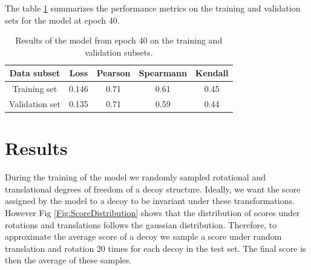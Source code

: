 \documentclass[a4paper,10pt]{article}
\begin{document}
The table \ref{Tbl:TrainingResults} summarizes the performance metrics on the training and validation sets for the model at epoch 40.

\begin{table}[H]
\begin{center}
\begin{tabular}{ c | c | c | c | c }
    Data subset & Loss & Pearson & Spearmann & Kendall \\
    \hline
    Training set     &0.146 &0.71 &0.61 &0.45 \\
    Validation set   &0.135 &0.71 &0.59 &0.44 \\ \hline

\end{tabular}
  \caption {Results of the model from epoch 40 on the training and validation subsets.}
    \label{Tbl:TrainingResults}
\end{center}
\end{table}

\section{Results}
During the training of the model we randomly sampled rotational and translational degrees of freedom of a decoy structure. Ideally, we 
want the score assigned by the model to a decoy to be invariant under these transformations. However Fig \ref{Fig:ScoreDistribution} 
shows that the distribution
of scores under rotations and translations follows the gaussian distribution. Therefore, to approximate the average score of a decoy we 
sample a score under random translation and rotation 20 times for each decoy in the test set. The final score is then the average of these 
samples.
\end{document}
